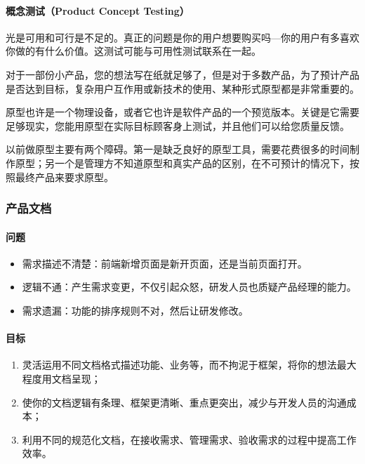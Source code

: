 \documentclass[letterpaper,10pt,english]{sphinxmanual}
\begin{document}
\paragraph{概念测试（Product Concept Testing）}
\label{\detokenize{chapter_project/inspect:product-concept-testing}}
光是可用和可行是不足的。真正的问题是你的用户想要购买吗—你的用户有多喜欢\sphinxhyphen{}你做的有什么价值。这测试可能与可用性测试联系在一起。

对于一部份小产品，您的想法写在纸就足够了，但是对于多数产品，为了预计产品是否达到目标，复杂用户互作用或新技术的使用、某种形式原型都是非常重要的。

原型也许是一个物理设备，或者它也许是软件产品的一个预览版本。关键是它需要足够现实，您能用原型在实际目标顾客身上测试，并且他们可以给您质量反馈。

以前做原型主要有两个障碍。第一是缺乏良好的原型工具，需要花费很多的时间制作原型；另一个是管理方不知道原型和真实产品的区别，在不可预计的情况下，按照最终产品来要求原型。


\subsubsection{产品文档}
\label{\detokenize{chapter_project/product_document:id1}}\label{\detokenize{chapter_project/product_document::doc}}

\paragraph{问题}
\label{\detokenize{chapter_project/product_document:id2}}\begin{itemize}
\item {} 
需求描述不清楚：前端新增页面是新开页面，还是当前页面打开。

\item {} 
逻辑不通：产生需求变更，不仅引起众怒，研发人员也质疑产品经理的能力。

\item {} 
需求遗漏：功能的排序规则不对，然后让研发修改。

\end{itemize}


\paragraph{目标}
\label{\detokenize{chapter_project/product_document:id3}}\begin{enumerate}
%
\item {} 
灵活运用不同文档格式描述功能、业务等，而不拘泥于框架，将你的想法最大程度用文档呈现；

\item {} 
使你的文档逻辑有条理、框架更清晰、重点更突出，减少与开发人员的沟通成本；

\item {} 
利用不同的规范化文档，在接收需求、管理需求、验收需求的过程中提高工作效率。

\end{enumerate}
\end{document}
